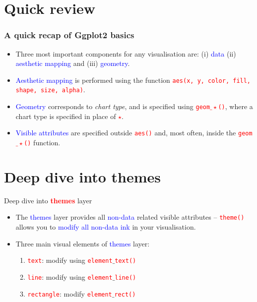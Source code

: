\documentclass{beamer}
\begin{document}
\section{Quick review}
\begin{frame}\frametitle{A quick recap of Ggplot2 basics}
\begin{itemize}
\item Three most important components for any visualisation are: (i) \textcolor{blue}{data} (ii) \textcolor{blue}{aesthetic mapping} and (iii) \textcolor{blue}{geometry}.
\vspace{0.3in}
\item<2-> \textcolor{blue}{Aesthetic mapping} is performed using the function \texttt{\textcolor{red}{aes(x, y, color, fill, shape, size, alpha)}}.
\vspace{0.3in}
\item<3-> \textcolor{blue}{Geometry} corresponds to \textit{chart type}, and is specified using \texttt{\textcolor{red}{geom$\_\star$}\textcolor{red}{()}}, where a chart type is specified in place of \textcolor{red}{$\star$}.
\vspace{0.3in}
\item<4-> \textcolor{blue}{Visible attributes} are specified outside \texttt{\textcolor{red}{aes()}} and, most often, inside the \texttt{\textcolor{red}{geom$\_\star$}\textcolor{red}{()}} function. 
\end{itemize}
\end{frame}

\section{Deep dive into themes}
\begin{frame}{Deep dive into \textbf{\textcolor{red}{themes}} layer}
\Large
\begin{itemize}
\item The \textcolor{blue}{themes} layer provides all \textcolor{blue}{non-data} related visible attributes -- \texttt{\textcolor{red}{theme()}} allows you to \textcolor{blue}{modify all non-data ink} in your visualisation.

\vspace{0.3in}

\item Three main visual elements of \textcolor{blue}{themes} layer: 
\begin{enumerate}
\Large
\item \texttt{\textcolor{red}{text}}: modify using \texttt{\textcolor{red}{element}$\_$\textcolor{red}{text()}}
\item \texttt{\textcolor{red}{line}}: modify using \texttt{\textcolor{red}{element}$\_$\textcolor{red}{line()}}
\item \texttt{\textcolor{red}{rectangle}}: modify \texttt{\textcolor{red}{element}$\_$\textcolor{red}{rect()}}
\end{enumerate}
\end{itemize}
\end{frame}
\end{document}
